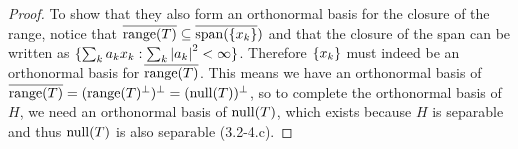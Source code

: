 \begin{proof}
To show that they also form an orthonormal basis for the closure of the range, notice that $\overline{\operatorname*{range}(T)} \subseteq \overline{\operatorname*{span}(\{x_k\}})$ and that the closure of the span can be written as $\{\sum_k a_k x_k: \sum_k \left\lvert a_k\right\rvert^2 < \infty\}$.
Therefore $\{x_k\}$ must indeed be an orthonormal basis for $\overline{\operatorname*{range}(T)}$.
This means we have an orthonormal basis of $\overline{\operatorname*{range}(T)} = (\operatorname*{range}(T)^\perp)^\perp = (\operatorname*{null}(T))^\perp$, so to complete the orthonormal basis of $H$, we need an orthonormal basis of $\operatorname*{null}(T)$, which exists because $H$ is separable and thus $\operatorname*{null}(T)$ is also separable (3.2-4.c).
\end{proof}
